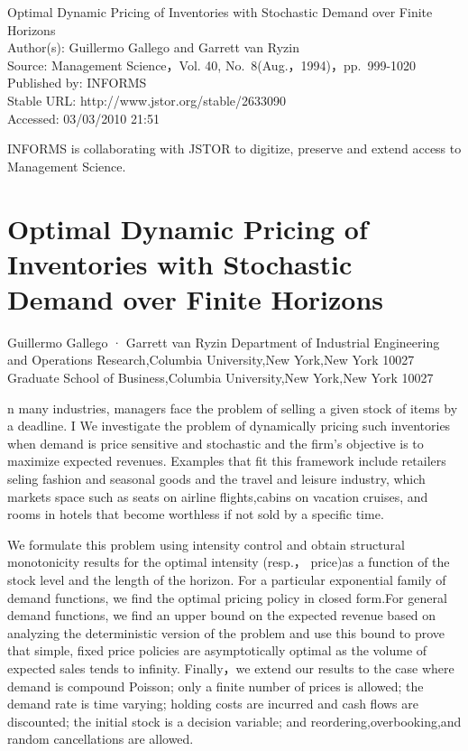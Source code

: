 


Optimal Dynamic Pricing of Inventories with Stochastic Demand over
Finite Horizons\\
Author(s): Guillermo Gallego and Garrett van Ryzin\\
Source: Management Science，Vol. 40, No.~8(Aug.，1994)，pp.~999-1020\\
Published by: INFORMS\\
Stable URL: http://www.jstor.org/stable/2633090\\
Accessed: 03/03/2010 21:51

INFORMS is collaborating with JSTOR to digitize, preserve and extend
access to Management Science.

\section{Optimal Dynamic Pricing of Inventories with Stochastic Demand
over Finite
Horizons}\label{optimal-dynamic-pricing-of-inventories-with-stochastic-demand-over-finite-horizons}

Guillermo Gallego · Garrett van Ryzin Department of Industrial
Engineering and Operations Research,Columbia University,New York,New
York 10027 Graduate School of Business,Columbia University,New York,New
York 10027

n many industries, managers face the problem of selling a given stock of
items by a deadline. I We investigate the problem of dynamically pricing
such inventories when demand is price sensitive and stochastic and the
firm's objective is to maximize expected revenues. Examples that fit
this framework include retailers seling fashion and seasonal goods and
the travel and leisure industry, which markets space such as seats on
airline flights,cabins on vacation cruises, and rooms in hotels that
become worthless if not sold by a specific time.

We formulate this problem using intensity control and obtain structural
monotonicity results for the optimal intensity (resp.， price)as a
function of the stock level and the length of the horizon. For a
particular exponential family of demand functions, we find the optimal
pricing policy in closed form.For general demand functions, we find an
upper bound on the expected revenue based on analyzing the deterministic
version of the problem and use this bound to prove that simple, fixed
price policies are asymptotically optimal as the volume of expected
sales tends to infinity. Finally，we extend our results to the case
where demand is compound Poisson; only a finite number of prices is
allowed; the demand rate is time varying; holding costs are incurred and
cash flows are discounted; the initial stock is a decision variable; and
reordering,overbooking,and random cancellations are allowed.

